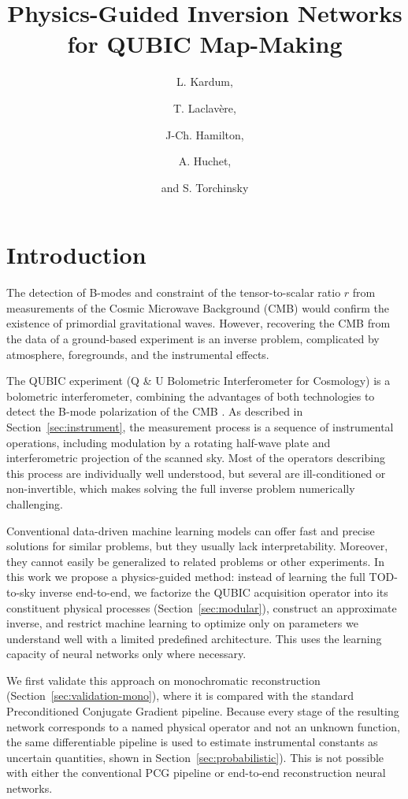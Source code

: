 \documentclass[a4paper,11pt]{article}
\title{\boldmath Physics-Guided Inversion Networks for QUBIC Map-Making }
\author[a]{L. Kardum,}
\author[a]{T. Laclavère,}
\author[a]{J-Ch. Hamilton,}
\author[a]{A. Huchet,}
\author[a]{and S. Torchinsky}
\affiliation[a]{Universite de Paris, CNRS, Astroparticule et Cosmologie, \\ F-75006 Paris, France}
\begin{document}
\maketitle
\flushbottom

\section{Introduction}
\label{sec:intro}

The detection of B-modes and constraint of the tensor-to-scalar ratio $r$ from measurements of the Cosmic Microwave Background (CMB) would confirm the existence of primordial gravitational waves. However, recovering the CMB from the data of a ground-based experiment is an inverse problem, complicated by atmosphere, foregrounds, and the instrumental effects.

The QUBIC experiment (Q \& U Bolometric Interferometer for Cosmology) is a bolometric interferometer, combining the advantages of both technologies to detect the B-mode polarization of the CMB \cite{hamilton2022qubic1, mousset2022qubic2}. As described in Section~\ref{sec:instrument}, the measurement process is a sequence of instrumental operations, including modulation by a rotating half-wave plate and interferometric projection of the scanned sky. Most of the operators describing this process are individually well understood, but several are ill-conditioned or non-invertible, which makes solving the full inverse problem numerically challenging.

Conventional data-driven machine learning models can offer fast and precise solutions for similar problems, but they usually lack interpretability. Moreover, they cannot easily be generalized to related problems or other experiments. In this work we propose a physics-guided method: instead of learning the full TOD-to-sky inverse end-to-end, we factorize the QUBIC acquisition operator into its constituent physical processes (Section~\ref{sec:modular}), construct an approximate inverse, and restrict machine learning to optimize only on parameters we understand well with a limited predefined architecture. This uses the learning capacity of neural networks only where necessary.

We first validate this approach on monochromatic reconstruction (Section~\ref{sec:validation-mono}), where it is compared with the standard Preconditioned Conjugate Gradient pipeline. Because every stage of the resulting network corresponds to a named physical operator and not an unknown function, the same differentiable pipeline is used to estimate instrumental constants as uncertain quantities, shown in Section~\ref{sec:probabilistic}). This is not possible with either the conventional PCG pipeline or end-to-end reconstruction neural networks.
\end{document}
